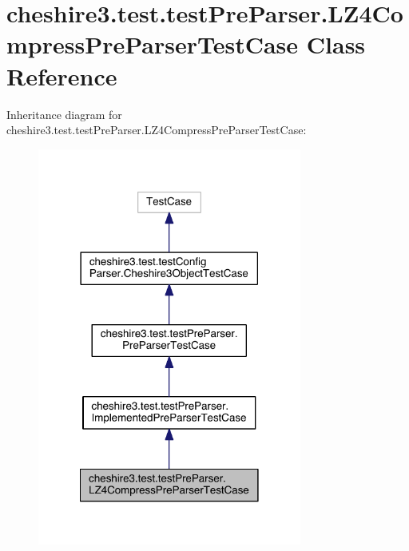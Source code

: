 \hypertarget{classcheshire3_1_1test_1_1test_pre_parser_1_1_l_z4_compress_pre_parser_test_case}{\section{cheshire3.\-test.\-test\-Pre\-Parser.\-L\-Z4\-Compress\-Pre\-Parser\-Test\-Case Class Reference}
\label{classcheshire3_1_1test_1_1test_pre_parser_1_1_l_z4_compress_pre_parser_test_case}
}


Inheritance diagram for cheshire3.\-test.\-test\-Pre\-Parser.\-L\-Z4\-Compress\-Pre\-Parser\-Test\-Case\-:
\nopagebreak
\begin{figure}[H]
\begin{center}
\leavevmode
\includegraphics[width=246pt]{classcheshire3_1_1test_1_1test_pre_parser_1_1_l_z4_compress_pre_parser_test_case__inherit__graph}
\end{center}
\end{figure}



